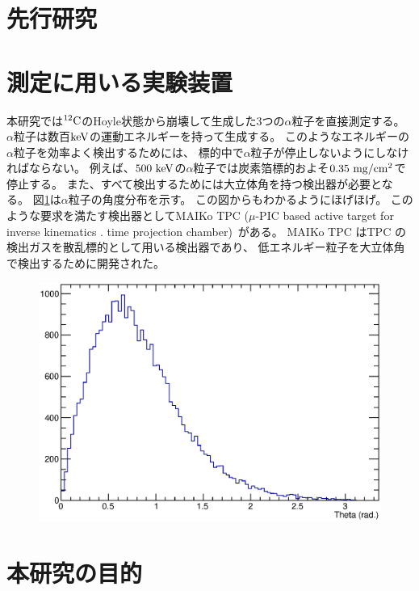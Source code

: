 \section{先行研究}

\section{測定に用いる実験装置}
本研究では${}^{12}\rm{C}$のHoyle状態から崩壊して生成した3つの$\alpha$粒子を直接測定する。
$\alpha$粒子は数百$\rm{keV}$の運動エネルギーを持って生成する。
このようなエネルギーの$\alpha$粒子を効率よく検出するためには、
標的中で$\alpha$粒子が停止しないようにしなければならない。
例えば、$500~\rm{keV}$の$\alpha$粒子では炭素箔標的およそ$0.35~\rm{mg/cm^2}$で停止する。
また、すべて検出するためには大立体角を持つ検出器が必要となる。%
図\ref{fig::alpha_theta_dist}は$\alpha$粒子の角度分布を示す。
この図からもわかるようにほげほげ。
このような要求を満たす検出器としてMAIKo TPC ($\mu$-PIC based active target for inverse kinematics .
time projection chamber)~\cite{maiko, mupic}がある。
MAIKo TPC はTPC の検出ガスを散乱標的として用いる検出器であり、
低エネルギー粒子を大立体角で検出するために開発された。
\begin{figure}
  \centering
  \includegraphics[clip, width=0.7\columnwidth]{eps/alpha_theta_dist.eps}
  \caption{}
  \label{fig::alpha_theta_dist}
\end{figure}

\section{本研究の目的}
\label{thiswork}
